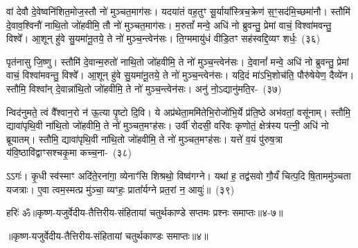 वां देवौ दे॒वेष्वनि॑शित॒मोज॒स्तौ नो॑ मुञ्चत॒माग॑सः। यदया॑तं वह॒तुꣳ सू॒र्याया᳚स्त्रिच॒क्रेण॑ स॒ꣳ॒सद॑मि॒च्छमा॑नौ। स्तौमि॑ दे॒वाव॒श्विनौ॑ नाथि॒तो जो॑हवीमि॒ तौ नो॑ मुञ्चत॒माग॑सः। म॒रुतां᳚ मन्वे॒ अधि॑ नो ब्रुवन्तु॒ प्रेमां वाचं॒ विश्वा॑मवन्तु॒ विश्वे᳚। आ॒शून् हु॑वे सु॒यमा॑नू॒तये॒ ते नो॑ मुञ्च॒न्त्वेन॑सः। ति॒ग्ममायु॑धं वीडि॒तꣳ सह॑स्वद्दि॒व्यꣳ शर्धः॒~(३६)\ip

पृत॑नासु जि॒ष्णु। स्तौमि॑ दे॒वान्म॒रुतो॑ नाथि॒तो जो॑हवीमि॒ ते नो॑ मुञ्च॒न्त्वेन॑सः। दे॒वानां᳚ मन्वे॒ अधि॑ नो ब्रुवन्तु॒ प्रेमां वाचं॒ विश्वा॑मवन्तु॒ विश्वे᳚। आ॒शून् हु॑वे सु॒यमा॑नू॒तये॒ ते नो॑ मुञ्च॒न्त्वेन॑सः। यदि॒दं मा॑\-ऽ\-भि॒शोच॑ति॒ पौरु॑षेयेण॒ दैव्ये॑न। स्तौमि॒ विश्वा᳚न् दे॒वान्ना॑थि॒तो जो॑हवीमि॒ ते नो॑ मुञ्च॒न्त्वेन॑सः। अनु॑ नो॒\-ऽद्यानु॑मति॒र-~(३७)\ip

न्विद॑नुमते॒ त्वं वै᳚श्वान॒रो न॑ ऊ॒त्या पृ॒ष्टो दि॒वि। ये अप्र॑थेता॒ममि॑तेभि॒रोजो॑भि॒र्ये प्र॑ति॒ष्ठे अभ॑वतां॒ वसू॑नाम्। स्तौमि॒ द्यावा॑\-पृथि॒वी ना॑थि॒तो जो॑हवीमि॒ ते नो॑ मुञ्चत॒मꣳह॑सः। उर्वी॑ रोदसी॒ वरि॑वः कृणोतं॒ क्षेत्र॑स्य पत्नी॒ अधि॑ नो ब्रूयातम्। स्तौमि॒ द्यावा॑\-पृथि॒वी ना॑थि॒तो जो॑हवीमि॒ ते नो॑ मुञ्चत॒मꣳह॑सः। यत्ते॑ व॒यं पु॑रुष॒त्रा य॑वि॒ष्ठावि॑द्वाꣳसश्चकृ॒मा कच्च॒ना-~(३८)\ip

ऽऽगः॑। कृ॒धी स्व॑स्माꣳ अदि॑ते॒रना॑गा॒ व्येनाꣳ॑सि शिश्रथो॒ विष्व॑गग्ने। यथा॑ ह॒ तद्व॑सवो गौ॒र्यं॑ चित्प॒दि षि॒ताममु॑ञ्चता यजत्राः। ए॒वा त्वम॒स्मत्प्र मु॑ञ्चा॒ व्यꣳहः॒ प्राता᳚र्यग्ने प्रत॒रां न॒ आयुः॑॥~(३९)\ip


{\anuvakamend[{गन्ता॑ दू॒षय॒न्थ्स्तौमि॒ ययोः॒ शर्धो\-ऽनु॑मति॒रनु॑ च॒न चतु॑स्त्रिꣳशच्च}]}%

{हरिः॑ ॐ}{॥कृष्ण-यजुर्वेदीय-तैत्तिरीय-संहितायां चतुर्थकाण्डे सप्तमः प्रश्नः समाप्तः॥४-७॥}

\centerline{॥कृष्ण-यजुर्वेदीय-तैत्तिरीय-संहितायां चतुर्थकाण्डः समाप्तः॥४॥}

\medskip

\centerline{\hyperref[sec:startkanda4]{\closesection}}


